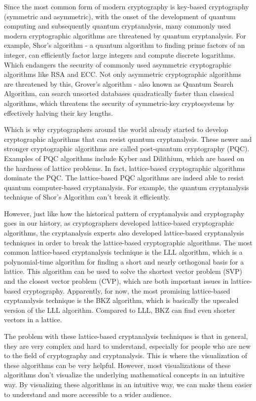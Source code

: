 \documentclass[runningheads]{llncs}
\begin{document}
Since the most common form of modern cryptography is key-based cryptography (symmetric and asymmetric), with the onset of the development of quantum computing and subsequently quantum cryptanalysis, many commonly used modern cryptographic algorithms are threatened by quantum cryptanalysis. For example, Shor's algorithm - a quantum algorithm to finding prime factors of an integer, can efficiently factor large integers and compute discrete logarithms. Which endangers the security of commonly used asymmetric cryptographic algorithms like RSA and ECC. Not only asymmetric cryptographic algorithms are threatened by this, Grover's algorithm - also known as Quantum Search Algorithm, can search unsorted databases quadratically faster than classical algorithms, which threatens the security of symmetric-key cryptosystems by effectively halving their key lengths. 

Which is why cryptographers around the world already started to develop cryptographic algorithms that can resist quantum cryptanalysis. These newer and stronger cryptographic algorithms are called post-quantum cryptography (PQC). Examples of PQC algorithms include Kyber and Dilithium, which are based on the hardness of lattice problems. In fact, lattice-based cryptographic algorithms dominate the PQC. The lattice-based PQC algorithms are indeed able to resist quantum computer-based cryptanalysis. For example, the quantum cryptanalysis technique of Shor's Algorithm can't break it efficiently.

However, just like how the historical pattern of cryptanalysis and cryptography goes in our history, as cryptographers developed lattice-based cryptographic algorithms, the cryptanalysis experts also developed lattice-based cryptanalysis techniques in order to break the lattice-based cryptographic algorithms. The most common lattice-based cryptanalysis technique is the LLL algorithm, which is a polynomial-time algorithm for finding a short and nearly orthogonal basis for a lattice. This algorithm can be used to solve the shortest vector problem (SVP) and the closest vector problem (CVP), which are both important issues in lattice-based cryptography. Apparently, for now, the most promising lattice-based cryptanalysis technique is the BKZ algorithm, which is basically the upscaled version of the LLL algorithm. Compared to LLL, BKZ can find even shorter vectors in a lattice.

The problem with these lattice-based cryptanalysis techniques is that in general, they are very complex and hard to understand, especially for people who are new to the field of cryptography and cryptanalysis. This is where the visualization of these algorithms can be very helpful. However, most visualizations of these algorithms don't visualize the underlying mathematical concepts in an intuitive way. By visualizing these algorithms in an intuitive way, we can make them easier to understand and more accessible to a wider audience. 
\end{document}
